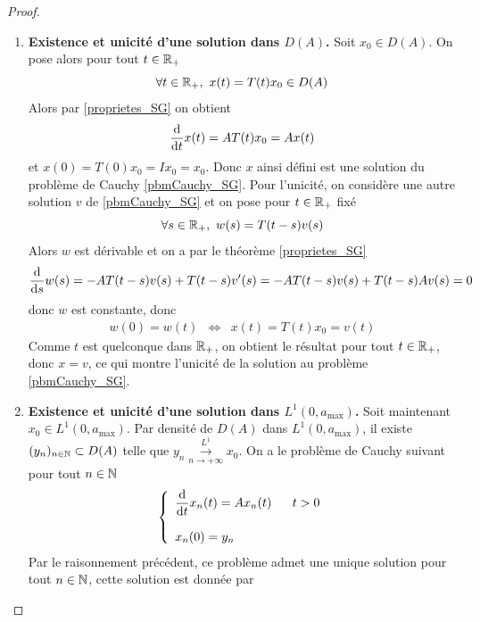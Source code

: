 \begin{proof}
    \begin{enumerate}
    \item \textbf{Existence et unicité d'une solution dans $D(A)$.} Soit $x_0 \in D(A)$. On pose alors pour tout $t \in \mathbb{R}_+$
    \begin{equation*}
        \forall t \in \mathbb{R}_+, \ x(t) = T(t)x_0 \in D(A)
    \end{equation*}
    Alors par \ref{proprietes_SG} on obtient 
    \begin{eqnarray*}
        \frac{\mathrm{d}}{\mathrm{d} t}x(t) = AT(t)x_0 = Ax(t)
    \end{eqnarray*}
    et $x(0)=T(0)x_0=Ix_0=x_0$. Donc $x$ ainsi défini est une solution du problème de Cauchy \eqref{pbmCauchy_SG}. Pour l'unicité, on considère une autre solution $v$ de \eqref{pbmCauchy_SG} et on pose pour $t \in \mathbb{R}_+$ fixé
    \begin{equation*}
        \forall s \in \mathbb{R}_+, \ w(s) = T(t-s)v(s)
    \end{equation*}
    Alors $w$ est dérivable et on a par le théorème \ref{proprietes_SG}
    \begin{equation*}
        \frac{\mathrm{d}}{\mathrm{d} s} w(s) = -AT(t-s)v(s) + T(t-s)v'(s) = -AT(t-s)v(s) + T(t-s)Av(s) = 0
    \end{equation*}
    donc $w$ est constante, donc 
    \begin{eqnarray*}
        w(0)=w(t) &\iff& x(t) = T(t)x_0 = v(t)
    \end{eqnarray*}
    Comme $t$ est quelconque dans $\mathbb{R}_+$, on obtient le résultat pour tout $t \in \mathbb{R}_+$, donc $x=v$, ce qui montre l'unicité de la solution au problème \eqref{pbmCauchy_SG}.
    \item \textbf{Existence et unicité d'une solution dans $L^1(0,a_{\max})$.} Soit maintenant $x_0 \in L^1(0,a_{\max})$. Par densité de $D(A)$ dans $L^1(0,a_{\max})$, il existe $(y_n)_{n \in \mathbb{N}} \subset D(A)$ telle que $y_n \overset{L^1}{\underset{n \to +\infty}{\longrightarrow}} x_0$. On a le problème de Cauchy suivant pour tout $n \in \mathbb{N}$
    \begin{equation*}
        \left\{\begin{array}{l}
            \dfrac{\mathrm{d}}{\mathrm{d} t}x_n(t) = Ax_n(t) \ \ \ \ \ t>0 \\
            \\
            x_n(0)=y_n
        \end{array}\right.
    \end{equation*}
    Par le raisonnement précédent, ce problème admet une unique solution pour tout $n \in \mathbb{N}$, cette solution est donnée par 

\end{enumerate}
\end{proof}

